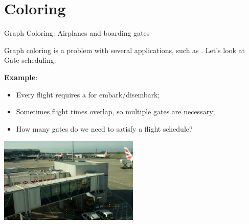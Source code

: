 \section{Coloring}



\begin{frame}{Graph Coloring: Airplanes and boarding gates}

  Graph coloring is a problem with several applications, such as . Let's look at Gate scheduling:\bigskip

    {\bf Example}:
    \begin{itemize}
    \item Every flight requires a  for embark/disembark;
    \item Sometimes flight times overlap, so multiple gates are necessary;
    \item How many gates do we need to satisfy a flight schedule?
    \end{itemize}

  \hfill \includegraphics[width=0.5\textwidth]{../img/airgate}

\end{frame}

